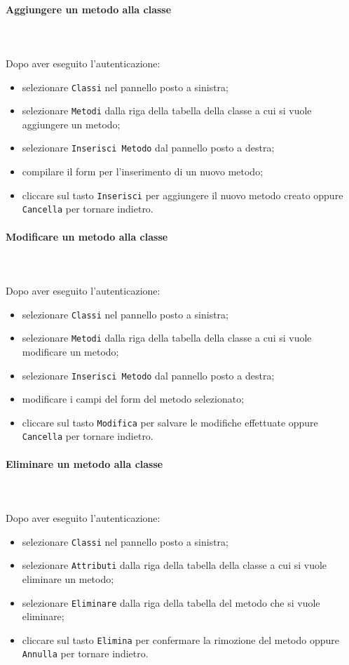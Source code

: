 	\paragraph{Aggiungere un metodo alla classe} \mbox{}\\ \mbox{}\\
	Dopo aver eseguito l'autenticazione:
	\begin{itemize}
		\item selezionare \texttt{Classi} nel pannello posto a sinistra;
		\item selezionare \texttt{Metodi} dalla riga della tabella della classe
		a cui si vuole aggiungere un metodo;
		\item selezionare \texttt{Inserisci Metodo} dal pannello posto a destra;
		\item compilare il form per l'inserimento di un nuovo metodo;
		\item cliccare sul tasto \texttt{Inserisci} per aggiungere il nuovo metodo 
		creato oppure \texttt{Cancella} per tornare indietro.	
	\end{itemize}
	
	\paragraph{Modificare un metodo alla classe} \mbox{}\\ \mbox{}\\
	Dopo aver eseguito l'autenticazione:
	\begin{itemize}
		\item selezionare \texttt{Classi} nel pannello posto a sinistra;
		\item selezionare \texttt{Metodi} dalla riga della tabella della classe
		a cui si vuole modificare un metodo;
		\item selezionare \texttt{Inserisci Metodo} dal pannello posto a destra;
		\item modificare i campi del form del metodo selezionato;
		\item cliccare sul tasto \texttt{Modifica} per salvare le modifiche effettuate
		oppure \texttt{Cancella} per tornare indietro.	
	\end{itemize}
	
	\paragraph{Eliminare un metodo alla classe} \mbox{}\\ \mbox{}\\
	Dopo aver eseguito l'autenticazione:
	\begin{itemize}
		\item selezionare \texttt{Classi} nel pannello posto a sinistra;
		\item selezionare \texttt{Attributi} dalla riga della tabella della classe
		a cui si vuole eliminare un metodo;\
		\item selezionare \texttt{Eliminare} dalla riga della tabella del metodo
		che si vuole eliminare;
		\item cliccare sul tasto \texttt{Elimina} per confermare la rimozione del metodo
		oppure \texttt{Annulla} per tornare indietro.
	\end{itemize}
	
